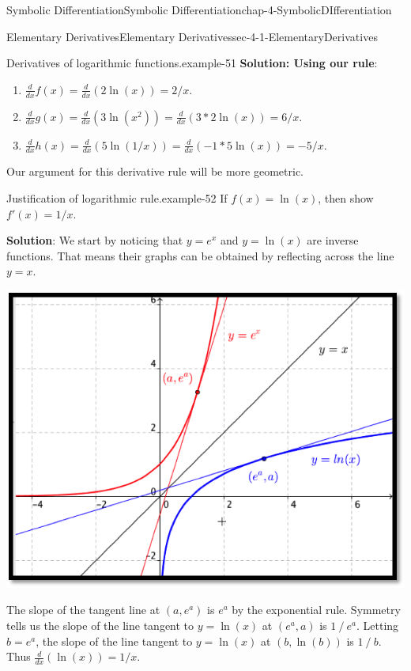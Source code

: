\documentclass[oneside,10pt,]{book}
\newcommand{\terminology}[1]{\textbf{#1}}
\numberwithin{equation}{section}
\begin{document}
\begin{chapterptx}{Symbolic Differentiation}{}{Symbolic Differentiation}{}{}{chap-4-SymbolicDIfferentiation}
\begin{sectionptx}{Elementary Derivatives}{}{Elementary Derivatives}{}{}{sec-4-1-ElementaryDerivatives}
\begin{example}{Derivatives of logarithmic functions.}{example-51}
\hypertarget{p-1471}{}%
\terminology{Solution: Using our rule}:%
\leavevmode%
\begin{enumerate}[label=(\alph*)]
\item\hypertarget{li-472}{}\(\frac{d}{dx} f(x)=  \frac{d}{dx} (2 \ln(x))=2/x.\)%
\item\hypertarget{li-473}{}\(\frac{d}{dx} g(x)=\frac{d}{dx}  (3 \ln(x^2))= \frac{d}{dx}  (3*2\ln(x))=6/x.\)%
\item\hypertarget{li-474}{}\(\frac{d}{dx} h(x)=\frac{d}{dx}  (5 \ln(1/x))= \frac{d}{dx}  (-1*5\ln(x))=-5/x.\)%
\end{enumerate}
\end{example}
\hypertarget{p-1472}{}%
Our argument for this derivative rule will be more geometric.%
\begin{example}{Justification of logarithmic rule.}{example-52}%
\hypertarget{p-1473}{}%
If \(f(x)=\ln(x)\), then show \(f'(x)=1/x\).%
\par
\hypertarget{p-1474}{}%
\terminology{Solution}: We start by noticing that \(y=e^x\) and \(y=\ln(x)\) are inverse functions.  That means their graphs can be obtained by reflecting across the line \(y=x\).%
\begin{sidebyside}{1}{0.1}{0.1}{0}%
\begin{sbspanel}{0.8}%
\includegraphics[width=1\linewidth]{images/sec4-1-2.png}
\end{sbspanel}%
\end{sidebyside}%
\par
\hypertarget{p-1475}{}%
The slope of the tangent line at \((a,e^a)\) is \(e^a\) by the exponential rule. Symmetry tells us the slope of the line tangent to \(y=\ln(x)\) at \((e^a,a)\)   is \(1⁄e^a\).  Letting \(b=e^a\), the slope of the line tangent to \(y=\ln(x)\) at \((b,\ln(b))\) is \(1⁄b\).   Thus \(\frac{d}{dx}(\ln(x))=1/x\).%

\end{example}
\end{sectionptx}
\end{chapterptx}
\end{document}
